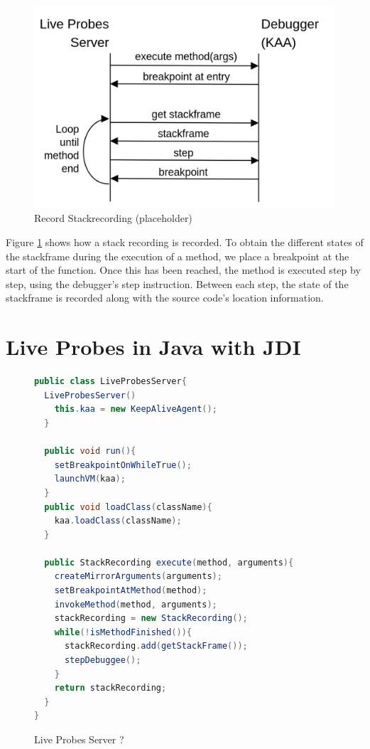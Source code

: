 \documentclass[english,submission]{programming}
\begin{document}
\begin{figure}[h]
  \centering
  \includegraphics[width=0.6\linewidth]{img/stackrecording_impl.png}
  \caption{Record Stackrecording (placeholder)}
  \label{fig:stack-recording-impl}
\end{figure}

Figure \ref{fig:stack-recording-impl} shows how a stack recording is recorded.
To obtain the different states of the stackframe during the execution of a method, we place a breakpoint at the start of the function.
Once this has been reached, the method is executed step by step, using the debugger's step instruction.
Between each step, the state of the stackframe is recorded along with the source code's location information.


\section{Live Probes in Java with JDI}
\label{sec:live-probes-java}
\begin{figure}[htbp]
  \centering
  \begin{lstlisting}[language=Java]
public class LiveProbesServer{
  LiveProbesServer()
    this.kaa = new KeepAliveAgent();
  }

  public void run(){
    setBreakpointOnWhileTrue();
    launchVM(kaa);
  }
  public void loadClass(className){
    kaa.loadClass(className);
  }

  public StackRecording execute(method, arguments){
    createMirrorArguments(arguments);
    setBreakpointAtMethod(method);
    invokeMethod(method, arguments);
    stackRecording = new StackRecording();
    while(!isMethodFinished()){
      stackRecording.add(getStackFrame());
      stepDebuggee();
    }
    return stackRecording;
  }
}
  \end{lstlisting}
  \caption{Live Probes Server ?}
  \label{fig:debugger-class}
\end{figure}
\end{document}
